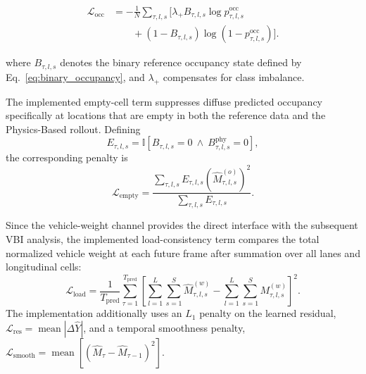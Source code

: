 \documentclass[journal]{IEEEtran}
\begin{document}
\begin{equation}
\begin{aligned}
\mathcal{L}_{\mathrm{occ}}
&=
-
\frac{1}{N}
\sum_{\tau,l,s}
\Bigg[
\lambda_{+}
B_{\tau,l,s}
\log
p_{\tau,l,s}^{\mathrm{occ}}
\\
&\qquad+
\left(
1-B_{\tau,l,s}
\right)
\log
\left(
1-p_{\tau,l,s}^{\mathrm{occ}}
\right)
\Bigg].
\end{aligned}
\end{equation}

where $B_{\tau,l,s}$ denotes the binary reference occupancy state defined by
Eq.~\eqref{eq:binary_occupancy}, and $\lambda_{+}$ compensates for class imbalance.

{\color{blue}
The implemented empty-cell term suppresses diffuse predicted occupancy specifically at locations that are empty in both the reference data and the Physics-Based rollout. Defining
\begin{equation}
E_{\tau,l,s}
=
\mathbb{I}\left[
B_{\tau,l,s}=0
\ \land\
B_{\tau,l,s}^{\mathrm{phy}}=0
\right],
\end{equation}
the corresponding penalty is
\begin{equation}
\mathcal{L}_{\mathrm{empty}}
=
\frac{
\sum_{\tau,l,s}
E_{\tau,l,s}
\left(
\widehat{M}_{\tau,l,s}^{(o)}
\right)^2
}{
\sum_{\tau,l,s}E_{\tau,l,s}
}.
\end{equation}
}

{\color{blue}
Since the vehicle-weight channel provides the direct interface with the subsequent VBI analysis, the implemented load-consistency term compares the total normalized vehicle weight at each future frame after summation over all lanes and longitudinal cells:
\begin{equation}
\mathcal{L}_{\mathrm{load}}
=
\frac{1}{T_{\mathrm{pred}}}
\sum_{\tau=1}^{T_{\mathrm{pred}}}
\left[
\sum_{l=1}^{L}\sum_{s=1}^{S}
\widehat{M}_{\tau,l,s}^{(w)}
-
\sum_{l=1}^{L}\sum_{s=1}^{S}
M_{\tau,l,s}^{(w)}
\right]^2.
\end{equation}
The implementation additionally uses an $L_1$ penalty on the learned residual, $\mathcal{L}_{\mathrm{res}}=\operatorname{mean}|\Delta\widehat{Y}|$, and a temporal smoothness penalty, $\mathcal{L}_{\mathrm{smooth}}=\operatorname{mean}[(\widehat{M}_{\tau}-\widehat{M}_{\tau-1})^2]$.
}
\end{document}
